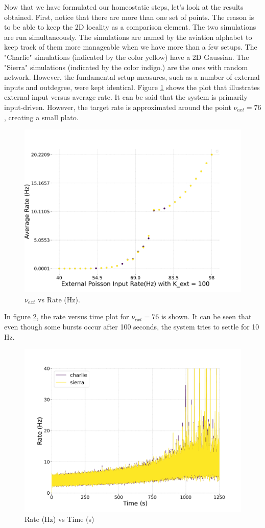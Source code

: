 \documentclass[a4paper,12pt]{article}
\begin{document}
Now that we have formulated our homeostatic steps, let's look at the results obtained. First, notice that there are more than one set of points. The reason is to be able to keep the 2D locality as a comparison element. The two simulations are run simultaneously. The simulations are named by the aviation alphabet to keep track of them more manageable when we have more than a few setups. The "Charlie" simulations (indicated by the color yellow) have a 2D Gaussian. The "Sierra" simulations (indicated by the color indigo.) are the ones with random network. However, the fundamental setup measures, such as a number of external inputs and outdegree, were kept identical. Figure \ref{charlie} shows the plot that illustrates external input versus average rate. It can be said that the system is primarily input-driven. However, the target rate is approximated around the point $\nu_{ext} = 76$, creating a small plato. 
\begin{figure}[H] 
    \centering
    \includegraphics[width=0.8\linewidth]{nuext_vs_activity_charlie.pdf}
    \caption{$\nu_{ext}$ vs Rate (Hz).}
    \label{charlie}
\end{figure}
In figure \ref{charlie76ratevstime}, the rate versus time plot for $\nu_{ext} = 76$ is shown. It can be seen that even though some bursts occur after 100 seconds, the system tries to settle for 10 Hz.
\begin{figure}[H] 
    \centering
    \includegraphics[width=0.8\linewidth]{nu_ext_76rate_over_time_homeostasis.pdf}
    \caption{Rate (Hz) vs Time (s)}
    \label{charlie76ratevstime}
\end{figure}
\end{document}
